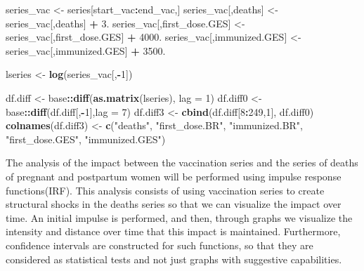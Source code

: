 \documentclass[
]{article}
\newenvironment{Shaded}{\begin{snugshade}}{\end{snugshade}}
\newcommand{\AttributeTok}[1]{\textcolor[rgb]{0.13,0.29,0.53}{#1}}
\newcommand{\DecValTok}[1]{\textcolor[rgb]{0.00,0.00,0.81}{#1}}
\newcommand{\FloatTok}[1]{\textcolor[rgb]{0.00,0.00,0.81}{#1}}
\newcommand{\FunctionTok}[1]{\textcolor[rgb]{0.13,0.29,0.53}{\textbf{#1}}}
\newcommand{\NormalTok}[1]{#1}
\newcommand{\OtherTok}[1]{\textcolor[rgb]{0.56,0.35,0.01}{#1}}
\newcommand{\SpecialCharTok}[1]{\textcolor[rgb]{0.81,0.36,0.00}{\textbf{#1}}}
\newcommand{\StringTok}[1]{\textcolor[rgb]{0.31,0.60,0.02}{#1}}
\renewenvironment{Shaded}{\begin{mdframed}[ backgroundcolor=shadecolor, linecolor = shadecolor, leftmargin=\dimexpr\leftmargin-2pt\relax, innerleftmargin=1.6pt, innertopmargin=5pt, skipabove=10pt,skipbelow=3pt ]}{\end{mdframed}}
\begin{document}
\begin{Shaded}
\begin{Highlighting}[]
\NormalTok{series\_vac }\OtherTok{\textless{}{-}}\NormalTok{ series[start\_vac}\SpecialCharTok{:}\NormalTok{end\_vac,]}
\NormalTok{series\_vac[,}\StringTok{\textquotesingle{}deaths\textquotesingle{}}\NormalTok{] }\OtherTok{\textless{}{-}}\NormalTok{ series\_vac[,}\StringTok{\textquotesingle{}deaths\textquotesingle{}}\NormalTok{] }\SpecialCharTok{+} \FloatTok{3.}
\NormalTok{series\_vac[,}\StringTok{\textquotesingle{}first\_dose.GES\textquotesingle{}}\NormalTok{] }\OtherTok{\textless{}{-}}\NormalTok{ series\_vac[,}\StringTok{\textquotesingle{}first\_dose.GES\textquotesingle{}}\NormalTok{] }\SpecialCharTok{+} \FloatTok{4000.}
\NormalTok{series\_vac[,}\StringTok{\textquotesingle{}immunized.GES\textquotesingle{}}\NormalTok{] }\OtherTok{\textless{}{-}}\NormalTok{ series\_vac[,}\StringTok{\textquotesingle{}immunized.GES\textquotesingle{}}\NormalTok{] }\SpecialCharTok{+} \FloatTok{3500.}

\NormalTok{lseries }\OtherTok{\textless{}{-}} \FunctionTok{log}\NormalTok{(series\_vac[,}\SpecialCharTok{{-}}\DecValTok{1}\NormalTok{])}

\NormalTok{df.diff  }\OtherTok{\textless{}{-}}\NormalTok{  base}\SpecialCharTok{::}\FunctionTok{diff}\NormalTok{(}\FunctionTok{as.matrix}\NormalTok{(lseries), }\AttributeTok{lag =} \DecValTok{1}\NormalTok{)}
\NormalTok{df.diff0  }\OtherTok{\textless{}{-}}\NormalTok{  base}\SpecialCharTok{::}\FunctionTok{diff}\NormalTok{(df.diff[,}\SpecialCharTok{{-}}\DecValTok{1}\NormalTok{],}\AttributeTok{lag =} \DecValTok{7}\NormalTok{)}
\NormalTok{df.diff3 }\OtherTok{\textless{}{-}} \FunctionTok{cbind}\NormalTok{(df.diff[}\DecValTok{8}\SpecialCharTok{:}\DecValTok{249}\NormalTok{,}\DecValTok{1}\NormalTok{], df.diff0)}
\FunctionTok{colnames}\NormalTok{(df.diff3) }\OtherTok{\textless{}{-}} \FunctionTok{c}\NormalTok{(}\StringTok{"deaths"}\NormalTok{,}
                        \StringTok{"first\_dose.BR"}\NormalTok{,}
                        \StringTok{"immunized.BR"}\NormalTok{,}
                        \StringTok{"first\_dose.GES"}\NormalTok{,}
                        \StringTok{"immunized.GES"}\NormalTok{)}
\end{Highlighting}
\end{Shaded}

The analysis of the impact between the vaccination series and the series
of deaths of pregnant and postpartum women will be performed using
impulse response functions(IRF). This analysis consists of using
vaccination series to create structural shocks in the deaths series so
that we can visualize the impact over time. An initial impulse is
performed, and then, through graphs we visualize the intensity and
distance over time that this impact is maintained. Furthermore,
confidence intervals are constructed for such functions, so that they
are considered as statistical tests and not just graphs with suggestive
capabilities.
\end{document}
